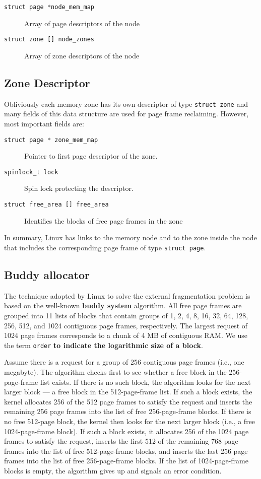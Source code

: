 \documentclass[10pt,a4paper]{article}
\begin{document}
\begin{description}
\item[\texttt{struct page *node\_mem\_map}] Array of page descriptors of the node
\item[\texttt{struct zone [] node\_zones}] Array of zone descriptors of the node
\end{description}

\subsection{Zone Descriptor}

Obliviously each memory zone has its own descriptor of type \texttt{struct zone} and many fields of this data structure are used for page frame reclaiming. However, most important fields are:

\begin{description}
\item[\texttt{struct page * zone\_mem\_map}] Pointer to first page descriptor of the zone.
\item[\texttt{spinlock\_t lock}] Spin lock protecting the descriptor.
\item[\texttt{struct free\_area [] free\_area}] Identifies the blocks of free page frames in the zone
\end{description}

In summary, Linux has links to the memory node and to the zone inside the node that includes the corresponding page frame of type \texttt{struct page}.

\subsection{Buddy allocator}

The technique adopted by Linux to solve the external fragmentation problem is based on the well-known \textbf{buddy system} algorithm. All free page frames are grouped into 11 lists of blocks that contain groups of 1, 2, 4, 8, 16, 32, 64, 128, 256, 512, and 1024 contiguous page frames, respectively. The largest request of 1024 page frames corresponds to a chunk of 4 MB of contiguous RAM. We use the term \texttt{order} \textbf{to indicate the logarithmic size of a block}.

Assume there is a request for a group of 256 contiguous page frames (i.e., one megabyte). The algorithm checks first to see whether a free block in the 256-page-frame list exists. If there is no such block, the algorithm looks for the next larger block — a free block in the 512-page-frame list. If such a block exists, the kernel allocates 256 of the 512 page frames to satisfy the request and inserts the remaining 256 page frames into the list of free 256-page-frame blocks. If there is no free 512-page block, the kernel then looks for the next larger block (i.e., a free 1024-page-frame block). If
such a block exists, it allocates 256 of the 1024 page frames to satisfy the request, inserts the first 512 of the remaining 768 page frames into the list of free 512-page-frame blocks, and inserts the last 256 page frames into the list of free 256-page-frame blocks. If the list of 1024-page-frame blocks is empty, the algorithm gives up and signals an error condition.
\end{document}
